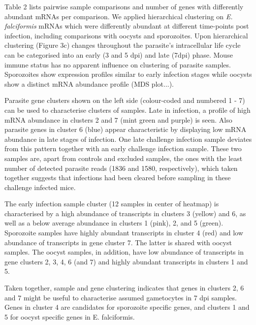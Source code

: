 \documentclass{bmcart}
\begin{document}
Table 2 lists pairwise sample comparisons and number of genes with
differently abundant mRNAs per comparison. We applied hierarchical clustering on 
\textit{E. falciformis} mRNAs which were differently abundant at different time-points 
post infection, including comparisons with oocysts and sporozoites. 
Upon hierarchical clustering (Figure 3c) changes throughout the parasite's intracellular life cycle 
can be categorised into an early (3 and 5 dpi) and late (7dpi) phase. 
Mouse immune status has no apparent influence on clustering of
parasite samples. Sporozoites show expression profiles similar to early infection stages
while oocysts show a distinct mRNA abundance profile (MDS plot...).

Parasite gene clusters shown on the left side (colour-coded and numbered 1 - 7) can be used 
to characterise clusters of samples. Late in infection, a profile of high mRNA abundance in clusters 2 and 7 (mint green and purple) is seen. Also parasite genes in cluster 6 (blue) appear characteristic  by displaying low mRNA abundance in late stages of infection. 
 One late challenge infection sample deviates from this pattern together with an early challenge infection sample. These two samples are, apart from controls and excluded samples, the ones with the least number of detected parasite reads (1836 and 1580, respectively), which taken together suggests that infections had been cleared before sampling in these challenge infected mice.

The early infection sample cluster (12 samples in center of heatmap) is characterised by a high abundance of transcripts in clusters 3 (yellow) and 6, as well as a below average abundance in clusters 1 (pink), 2, and 5 (green). 
Sporozoite samples have highly abundant transcripts in cluster 4 (red) and low abundance of 
transcripts in gene cluster 7. The latter is shared with oocyst samples. The oocyst samples, 
in addition, have low abundance of transcripts in gene clusters 2, 3, 4, 6 (and 7) and highly 
abundant transcripts in clusters 1 and 5. 

Taken together, sample and gene clustering indicates that genes in clusters 2, 6 and 7 might be 
useful to characterise assumed gametocytes in 7 dpi samples. Genes in cluster 4 are candidates 
for sporozoite specific genes, and clusters 1 and 5  for oocyst specific genes in E. falciformis.  

\end{document}
